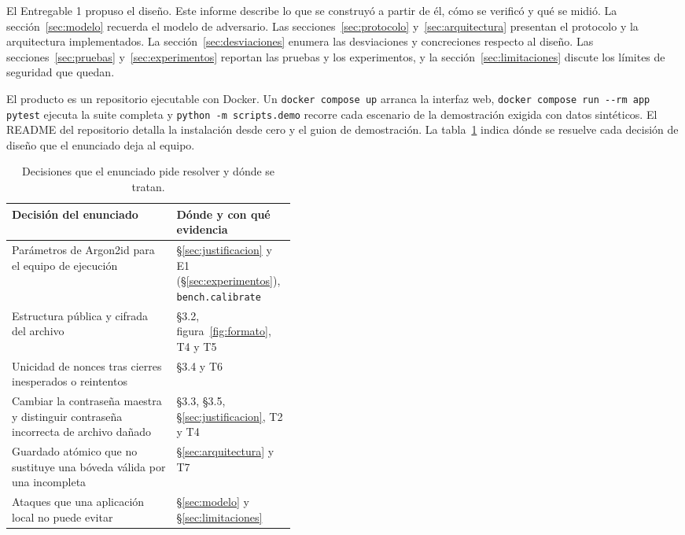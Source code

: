 \documentclass[11pt,letterpaper]{article}
\newcommand{\code}[1]{\texttt{#1}}
\begin{document}
El Entregable 1 propuso el diseño. Este informe describe lo que se construyó a partir de él, cómo se verificó y qué se midió. La sección~\ref{sec:modelo} recuerda el modelo de adversario. Las secciones~\ref{sec:protocolo} y~\ref{sec:arquitectura} presentan el protocolo y la arquitectura implementados. La sección~\ref{sec:desviaciones} enumera las desviaciones y concreciones respecto al diseño. Las secciones~\ref{sec:pruebas} y~\ref{sec:experimentos} reportan las pruebas y los experimentos, y la sección~\ref{sec:limitaciones} discute los límites de seguridad que quedan.

El producto es un repositorio ejecutable con Docker. Un \code{docker compose up} arranca la interfaz web, \code{docker compose run -{}-rm app pytest} ejecuta la suite completa y \code{python -m scripts.demo} recorre cada escenario de la demostración exigida con datos sintéticos. El README del repositorio detalla la instalación desde cero y el guion de demostración. La tabla~\ref{tab:enunciado} indica dónde se resuelve cada decisión de diseño que el enunciado deja al equipo.

\begin{table}[h]
\centering\small
\caption{Decisiones que el enunciado pide resolver y dónde se tratan.}
\label{tab:enunciado}
\begin{tabularx}{\linewidth}{@{}>{\raggedright\arraybackslash}X>{\raggedright\arraybackslash}p{0.42\linewidth}@{}}
\toprule
Decisión del enunciado & Dónde y con qué evidencia \\
\midrule
Parámetros de Argon2id para el equipo de ejecución & §\ref{sec:justificacion} y E1 (§\ref{sec:experimentos}), \code{bench.calibrate} \\
Estructura pública y cifrada del archivo & §3.2, figura~\ref{fig:formato}, T4 y T5 \\
Unicidad de nonces tras cierres inesperados o reintentos & §3.4 y T6 \\
Cambiar la contraseña maestra y distinguir contraseña incorrecta de archivo dañado & §3.3, §3.5, §\ref{sec:justificacion}, T2 y T4 \\
Guardado atómico que no sustituye una bóveda válida por una incompleta & §\ref{sec:arquitectura} y T7 \\
Ataques que una aplicación local no puede evitar & §\ref{sec:modelo} y §\ref{sec:limitaciones} \\
\bottomrule
\end{tabularx}
\end{table}
\end{document}

